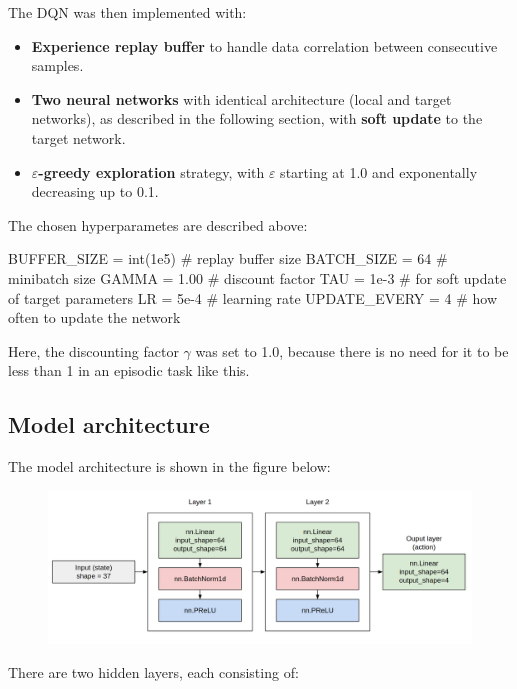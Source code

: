\documentclass{article}
\begin{document}
The DQN was then implemented with:

\begin{itemize}
    \item \textbf{Experience replay buffer} to handle data correlation between consecutive samples.
    \item \textbf{Two neural networks} with identical architecture (local and target networks), as described in the following section, with \textbf{soft update} to the target network.
    \item \textbf{$\varepsilon$-greedy exploration} strategy, with $\varepsilon$ starting at 1.0 and exponentally decreasing up to 0.1.
\end{itemize}

The chosen hyperparametes are described above:

\begin{code}[Python]
BUFFER_SIZE = int(1e5)  # replay buffer size
BATCH_SIZE = 64         # minibatch size
GAMMA = 1.00            # discount factor
TAU = 1e-3              # for soft update of target parameters
LR = 5e-4               # learning rate 
UPDATE_EVERY = 4        # how often to update the network
\end{code}

Here, the discounting factor $\gamma$ was set to 1.0, because there is no need for it to be less than 1 in an episodic task like this.

\subsection{Model architecture}

The model architecture is shown in the figure below:

\begin{figure}[H]
\centering
\includegraphics[scale=0.25]{img/model_arch.png}
\label{fig:model_arch}
\end{figure}

There are two hidden layers, each consisting of:
\end{document}
